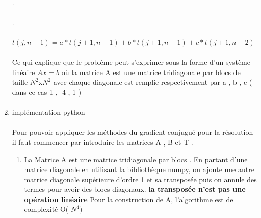 \documentclass{article}
\begin{document}
\begin{enumerate}
    \paragraph{}
    .
    \paragraph{} 
    .
    \paragraph{}
   	\fi
   $t(j,n-1) = a*t(j+1 , n-1) + b*t(j+1,n-1) + c*t(j+1,n-2)$ 
   
   \paragraph{} 
   Ce qui explique que le problème peut s'exprimer sous la forme d'un 
   système linéaire $Ax=b$ où la matrice A est une matrice tridiagonale par blocs 
   de taille $N^2$x$N^2$ avec chaque diagonale est remplie respectivement par a , b , c ( dans ce cas 1 , -4 , 1 )  
   \paragraph{}
   \item{implémentation python} 
 	\paragraph{} 
 	Pour pouvoir appliquer les méthodes du gradient conjugué pour la résolution il 
   faut commencer par introduire les matrices A , B et T . 
 	\begin{enumerate}
 		\item { La Matrice A est une matrice tridiagonale par blocs . 
     En partant d'une matrice diagonale en utilisant la bibliothèque numpy, 
     on ajoute une autre matrice diagonale supérieure d'ordre 1 et sa transposée 
     puis on annule des termes pour avoir des blocs diagonaux.
 		\textbf{ la transposée n'est pas une opération linéaire } 
 		Pour la construction de A, l'algorithme est de complexité O( $N^4)$ } 


\end{enumerate}
\end{enumerate}
\end{document}
